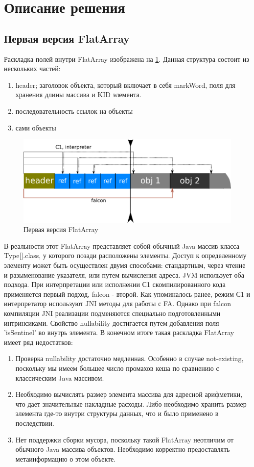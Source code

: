 \section{Описание решения} \label{label-description}
\subsection{Первая версия FlatArray}
Раскладка полей внутри FlatArray изображена на \ref{first-fa}.
Данная структура состоит из нескольких частей:
\begin{enumerate}
	\item header; заголовок объекта, который включает в себя markWord, поля для хранения длины массива и KID элемента.
	\item последовательность ссылок на объекты
	\item сами объекты
\end{enumerate}
\begin{figure}[h]
	\caption{Первая версия FlatArray}\label{first-fa}
	\includegraphics[width=0.95\linewidth]{image/flatarray.png}
\end{figure}
В реальности этот FlatArray представляет собой обычный Java массив класса Type[].class, у которого позади расположены элементы. Доступ к определенному элементу может быть осуществлен двумя способами: стандартным, через чтение и разыменование указателя, или путем вычисления адреса. 
JVM использует оба подхода. При интерпретации или исполнении С1 скомпилированного кода применяется первый подход, falcon - второй. 
Как упоминалось ранее, режим С1 и интерпретатор используют JNI методы для работы с FA. Однако при falcon компиляции JNI реализации подменяются специально подготовленными интринсиками. 
Свойство nullability достигается путем добавления поля 'isSentinel' во внутрь элемента. 
В конечном итоге такая раскладка FlatArray имеет ряд недостатков:
\begin{enumerate}
	\item Проверка nullability достаточно медленная. Особенно в случае not-existing, поскольку мы имеем большее число промахов кеша по сравнению с классическим Java массивом.
	\item Необходимо вычислять размер элемента массива для адресной арифметики, что дает значительные накладные расходы. Либо необходимо хранить размер элемента где-то внутри структуры данных, что и было применено в последствии.
	\item Нет поддержки сборки мусора, поскольку такой FlatArray неотличим от обычного Java массива объектов. 
	Необходимо корректно предоставлять метаинформацию о этом объекте. 
\end{enumerate}

